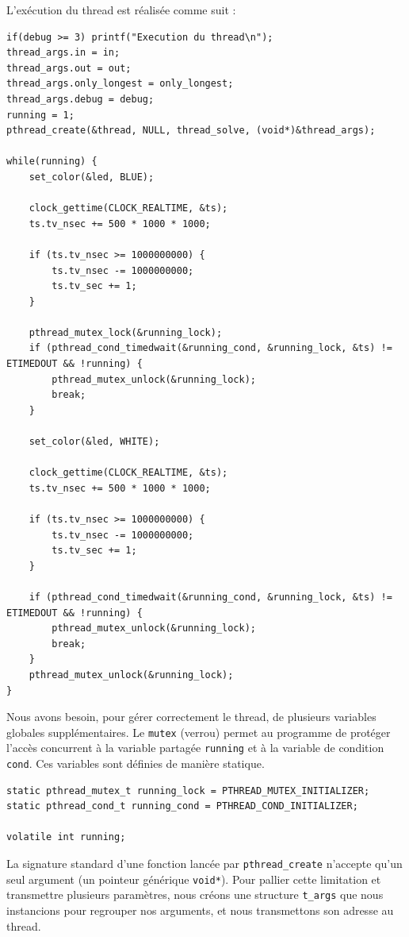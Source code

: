 \documentclass[a4paper,11pt]{article}
\begin{document}
L'exécution du thread est réalisée comme suit :
\begin{verbatim}
if(debug >= 3) printf("Execution du thread\n");
thread_args.in = in;
thread_args.out = out;
thread_args.only_longest = only_longest;
thread_args.debug = debug;
running = 1;
pthread_create(&thread, NULL, thread_solve, (void*)&thread_args);

while(running) {
    set_color(&led, BLUE);

    clock_gettime(CLOCK_REALTIME, &ts);
    ts.tv_nsec += 500 * 1000 * 1000;

    if (ts.tv_nsec >= 1000000000) {
        ts.tv_nsec -= 1000000000;
        ts.tv_sec += 1;
    }

    pthread_mutex_lock(&running_lock);
    if (pthread_cond_timedwait(&running_cond, &running_lock, &ts) != ETIMEDOUT && !running) {
        pthread_mutex_unlock(&running_lock);
        break;
    }

    set_color(&led, WHITE);

    clock_gettime(CLOCK_REALTIME, &ts);
    ts.tv_nsec += 500 * 1000 * 1000;

    if (ts.tv_nsec >= 1000000000) {
        ts.tv_nsec -= 1000000000;
        ts.tv_sec += 1;
    }
    
    if (pthread_cond_timedwait(&running_cond, &running_lock, &ts) != ETIMEDOUT && !running) {
        pthread_mutex_unlock(&running_lock);
        break;
    }
    pthread_mutex_unlock(&running_lock);
}

\end{verbatim}

Nous avons besoin, pour gérer correctement le thread, de plusieurs variables globales supplémentaires. Le \texttt{mutex} (verrou) permet au programme de protéger l'accès concurrent à la variable partagée \texttt{running} et à la variable de condition \texttt{cond}. Ces variables sont définies de manière statique.

\begin{verbatim}
static pthread_mutex_t running_lock = PTHREAD_MUTEX_INITIALIZER;
static pthread_cond_t running_cond = PTHREAD_COND_INITIALIZER;

volatile int running;
\end{verbatim}

La signature standard d'une fonction lancée par \texttt{pthread\_create} n'accepte qu'un seul argument (un pointeur générique \texttt{void*}). Pour pallier cette limitation et transmettre plusieurs paramètres, nous créons une structure \texttt{t\_args} que nous instancions pour regrouper nos arguments, et nous transmettons son adresse au thread.
\end{document}
